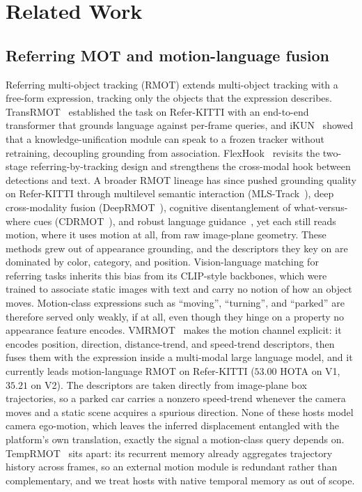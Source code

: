\documentclass[sigconf,review,anonymous]{acmart}
\begin{document}
\section{Related Work}
\label{sec:related}

\subsection{Referring MOT and motion-language fusion}
Referring multi-object tracking (RMOT) extends multi-object tracking with a free-form expression, tracking only the objects that the expression describes. TransRMOT~\cite{transrmot} established the task on Refer-KITTI with an end-to-end transformer that grounds language against per-frame queries, and iKUN~\cite{ikun} showed that a knowledge-unification module can speak to a frozen tracker without retraining, decoupling grounding from association. FlexHook~\cite{flexhook} revisits the two-stage referring-by-tracking design and strengthens the cross-modal hook between detections and text. A broader RMOT lineage has since pushed grounding quality on Refer-KITTI through multilevel semantic interaction (MLS-Track~\cite{mlstrack}), deep cross-modality fusion (DeepRMOT~\cite{deeprmot}), cognitive disentanglement of what-versus-where cues (CDRMOT~\cite{cdrmot}), and robust language guidance~\cite{tellmewhat}, yet each still reads motion, where it uses motion at all, from raw image-plane geometry. These methods grew out of appearance grounding, and the descriptors they key on are dominated by color, category, and position. Vision-language matching for referring tasks inherits this bias from its CLIP-style backbones, which were trained to associate static images with text and carry no notion of how an object moves. Motion-class expressions such as ``moving'', ``turning'', and ``parked'' are therefore served only weakly, if at all, even though they hinge on a property no appearance feature encodes. VMRMOT~\cite{vmrmot} makes the motion channel explicit: it encodes position, direction, distance-trend, and speed-trend descriptors, then fuses them with the expression inside a multi-modal large language model, and it currently leads motion-language RMOT on Refer-KITTI ($53.00$ HOTA on V1, $35.21$ on V2). The descriptors are taken directly from image-plane box trajectories, so a parked car carries a nonzero speed-trend whenever the camera moves and a static scene acquires a spurious direction. None of these hosts model camera ego-motion, which leaves the inferred displacement entangled with the platform's own translation, exactly the signal a motion-class query depends on. TempRMOT~\cite{temprmot} sits apart: its recurrent memory already aggregates trajectory history across frames, so an external motion module is redundant rather than complementary, and we treat hosts with native temporal memory as out of scope.
\end{document}
